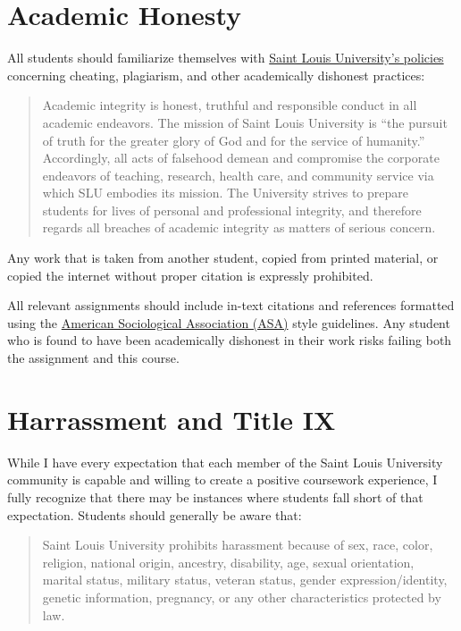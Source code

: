 \documentclass[]{book}
\theoremstyle{definition}
\theoremstyle{definition}
\theoremstyle{definition}
\theoremstyle{remark}
\begin{document}
\hypertarget{academic-honesty}{%
\section{Academic Honesty}\label{academic-honesty}}

All students should familiarize themselves with
\href{http://www.slu.edu/Documents/provost/academic_affairs/Academic\%20Integrity\%20Policy\%20FINAL\%20\%206-26-15.pd}{Saint
Louis University's policies} concerning cheating, plagiarism, and other
academically dishonest practices:

\begin{quote}
Academic integrity is honest, truthful and responsible conduct in all
academic endeavors. The mission of Saint Louis University is ``the
pursuit of truth for the greater glory of God and for the service of
humanity.'' Accordingly, all acts of falsehood demean and compromise the
corporate endeavors of teaching, research, health care, and community
service via which SLU embodies its mission. The University strives to
prepare students for lives of personal and professional integrity, and
therefore regards all breaches of academic integrity as matters of
serious concern.
\end{quote}

Any work that is taken from another student, copied from printed
material, or copied the internet without proper citation is expressly
prohibited.

All relevant assignments should include in-text citations and references
formatted using the
\href{https://owl.english.purdue.edu/owl/resource/583/1/}{American
Sociological Association (ASA)} style guidelines. Any student who is
found to have been academically dishonest in their work risks failing
both the assignment and this course.

\hypertarget{harrassment-and-title-ix}{%
\section{Harrassment and Title IX}\label{harrassment-and-title-ix}}

While I have every expectation that each member of the Saint Louis
University community is capable and willing to create a positive
coursework experience, I fully recognize that there may be instances
where students fall short of that expectation. Students should generally
be aware that:

\begin{quote}
Saint Louis University prohibits harassment because of sex, race, color,
religion, national origin, ancestry, disability, age, sexual
orientation, marital status, military status, veteran status, gender
expression/identity, genetic information, pregnancy, or any other
characteristics protected by law.
\end{quote}
\end{document}

